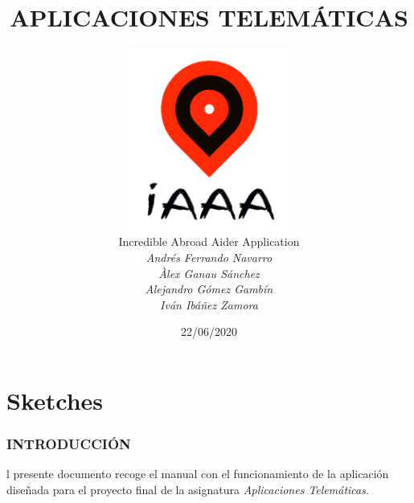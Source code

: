 \documentclass[letterpaper,twocolumn,openany,nodeprecatedcode,dvipsnames,nomultitoc]{dndbook}
\begin{document}
\title{\huge APLICACIONES TELEMÁTICAS}
\author{
\includegraphics[width=6cm,height=6cm]{Manual/img/iconosinfondo.png} \\

\hspace{10pt}
Incredible Abroad Aider Application\vspace{10pt}\\
\textit{Andrés Ferrando Navarro}\\
\textit{Àlex Ganau Sánchez}\\
\textit{Alejandro Gómez Gambín}\\
\textit{Iván Ibáñez Zamora}
}

\date{22/06/2020}


\frontmatter
\maketitle
\tableofcontents

\mainmatter
\part{Sketches}
\vspace{10pt}
\section{INTRODUCCIÓN}
\vspace{5pt}

\begin{justify}

l presente documento recoge el manual con el funcionamiento de la aplicación diseñada para el proyecto final de la asignatura \textit{Aplicaciones Telemáticas}.

\end{justify}
\end{document}
